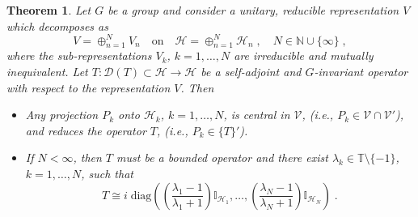 \documentclass[a4paper,12pt]{amsart}
\renewcommand{\H}{\mathcal{H}}
\newcommand{\1}{\mathbb{I}}
\newtheorem{theorem}{Theorem}
\numberwithin{equation}{section}
\numberwithin{theorem}{section}
\begin{document}
\begin{theorem}\label{thm:disjointirrep}
Let $G$ be a group and consider a unitary, reducible representation $V$ which decomposes as 
\[
 V=\mathop{\oplus}_{n=1}^N V_n \quad\mathrm{on}\quad \H=\mathop{\oplus}_{n=1}^N \H_n\;,\quad N\in\mathbb{N}\cup \{\infty\}\;,
\]
where the sub-representations $V_k$, $k=1,\dots, N$ are irreducible and mutually inequivalent.
Let $T\colon\mathcal{D}(T)\subset\mathcal{H}\to \H$ be a self-adjoint and $G$-invariant operator with respect to
the representation $V$. Then
\begin{itemize}
 \item[(i)] Any projection $P_k$ onto $\H_k$, $k=1,\dots, N$, is central in $\mathcal V$, (i.e., $P_k\in\mathcal{V}\cap\mathcal{V}'$), 
            and reduces the operator $T$, (i.e., $P_k\in\{T\}'$).
 \item[(ii)] If $N<\infty$, then $T$ must be a bounded operator and there exist $\lambda_k\in\mathbb{T}\setminus \{-1\}$, $k=1,\dots, N$, such that
\[
 T\cong i \;\mathrm{diag}\left( 
       \left(\frac{\lambda_1-1}{\lambda_1+1}\right)\1_{\mathcal{H}_{1}}, \dots, \left(\frac{\lambda_N-1}{\lambda_N+1}\right)\1_{\mathcal{H}_{N}}
                          \right)\;.
\]

\end{itemize}
\end{theorem}
\end{document}
